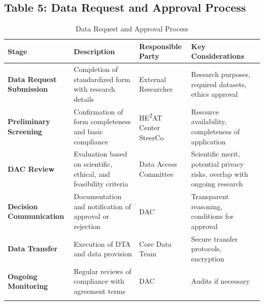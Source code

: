 \documentclass[12pt,a4paper,landscape]{article}
\begin{document}
\subsection*{Table 5: Data Request and Approval Process}
\begin{longtable}{p{3.5cm}p{6cm}p{4.5cm}p{5.5cm}}
\toprule
\textbf{Stage} & \textbf{Description} & \textbf{Responsible Party} & \textbf{Key Considerations} \\
\midrule
\endhead

\textbf{Data Request Submission} 
& Completion of standardized form with research details 
& External Researcher 
& Research purposes, required datasets, ethics approval \\
\midrule

\textbf{Preliminary Screening} 
& Confirmation of form completeness and basic compliance 
& HE\textsuperscript{2}AT Center SteerCo 
& Resource availability, completeness of application \\
\midrule

\textbf{DAC Review} 
& Evaluation based on scientific, ethical, and feasibility criteria 
& Data Access Committee 
& Scientific merit, potential privacy risks, overlap with ongoing research \\
\midrule

\textbf{Decision Communication} 
& Documentation and notification of approval or rejection 
& DAC 
& Transparent reasoning, conditions for approval \\
\midrule

\textbf{Data Transfer} 
& Execution of DTA and data provision 
& Core Data Team 
& Secure transfer protocols, encryption \\
\midrule

\textbf{Ongoing Monitoring} 
& Regular reviews of compliance with agreement terms 
& DAC 
& Audits if necessary \\
\bottomrule
\caption{Data Request and Approval Process}
\end{longtable}
\end{document}
